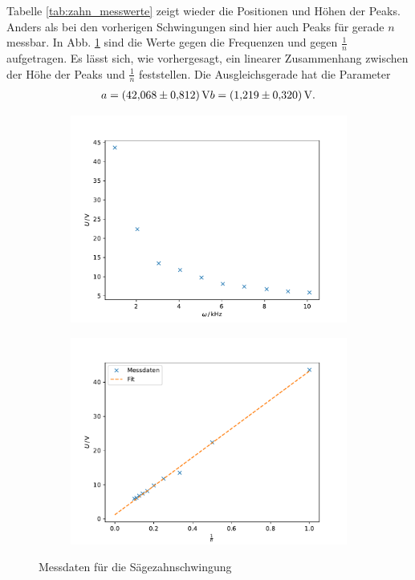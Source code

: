 Tabelle \ref{tab:zahn_messwerte} zeigt wieder die Positionen und Höhen der Peaks. Anders als bei den vorherigen Schwingungen sind hier auch Peaks für gerade $n$ messbar. In Abb. \ref{fig:zahn_fit} sind die Werte gegen die Frequenzen und gegen $\frac{1}{n}$ aufgetragen. Es lässt sich, wie vorhergesagt, ein linearer Zusammenhang zwischen der Höhe der Peaks und $\frac{1}{n}$ feststellen. Die Ausgleichsgerade hat die Parameter
\begin{align*}
    a = \SI{42.068 \pm 0.812}{V}
    b = \SI{1.219 \pm 0.320}{V} .
\end{align*}
\begin{figure}[h]
    \begin{subfigure}{0.5\textwidth}
        \centering
        \includegraphics[width=\textwidth]{assets/zahn_messung.pdf}
    \end{subfigure}
    \begin{subfigure}{0.5\textwidth}
        \centering
        \includegraphics[width=\textwidth]{assets/zahn_fit.pdf}
    \end{subfigure}
    \caption{Messdaten für die Sägezahnschwingung}
    \label{fig:zahn_fit}
\end{figure}
